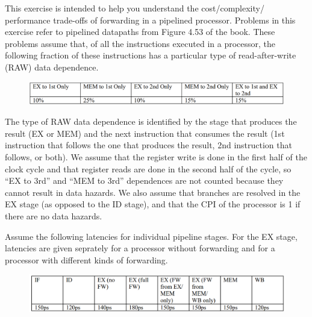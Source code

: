 \documentclass[addpoints]{exam}
\begin{document}
\begin{sloppypar}
\begin{questions}
    This exercise is intended to help you understand the cost/complexity/ performance trade-offs of forwarding in a pipelined processor. Problems in this exercise refer to pipelined datapaths from Figure 4.53 of the book. These problems assume that, of all the instructions executed in a processor, the following fraction of these instructions has a particular type of read-after-write (RAW) data dependence.

    \begin{figure}[ht]
        \centering
        \includegraphics[scale = 0.45]{q11_figi.png}
    \end{figure}

    The type of RAW data dependence is identified by the stage that produces the result (EX or MEM) and the next instruction that consumes the result (1st instruction that follows the one that produces the result, 2nd instruction that follows, or both). We assume that the register write is done in the first half of the clock cycle and that register reads are done in the second half of the cycle, so “EX to 3rd” and “MEM to 3rd” dependences are not counted because they cannot result in data hazards. We also assume that branches are resolved in the EX stage (as opposed to the ID stage), and that the CPI of the processor is 1 if there are no data hazards.

    Assume the following latencies for individual pipeline stages. For the EX stage, latencies are given seprately for a processor without forwarding and for a processor with different kinds of forwarding.

    \begin{figure}[ht]
        \centering
        \includegraphics[scale = 0.63]{q11_figii.png}
    \end{figure}

\end{questions}
\end{sloppypar}
\end{document}
